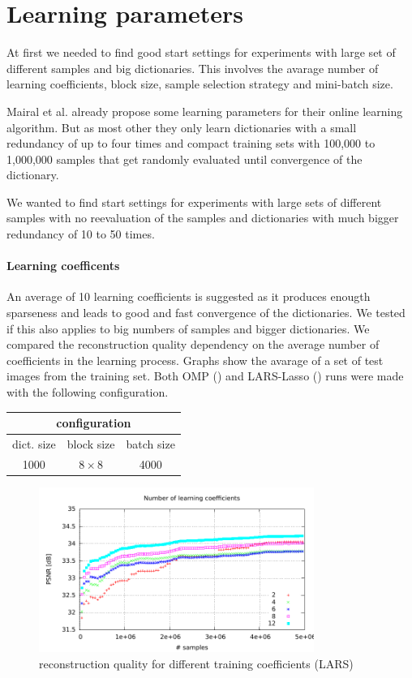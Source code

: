 \section{Learning parameters}
At first we needed to find good start settings for experiments with large set of
different samples and big dictionaries. This involves the
avarage number of learning coefficients, block size, sample selection strategy
and mini-batch size.

Mairal et al. already propose some learning parameters for their online
learning algorithm. But as most other they only learn dictionaries with
a small redundancy of up to four times and compact training sets with 100,000
to 1,000,000 samples that get randomly evaluated until convergence of the
dictionary.

We wanted to find start settings for experiments with large sets of
different samples with no reevaluation of the samples and dictionaries
with much bigger redundancy of 10 to 50 times.


\paragraph{Learning coefficents}
An average of 10 learning coefficients is suggested as it produces enougth
sparseness and leads to good and fast convergence of the dictionaries.
We tested if this also applies to big numbers of samples and bigger
dictionaries. We compared the reconstruction quality dependency on the average
number of coefficients in the learning process. Graphs show the avarage of a
set of test images from the training set. Both OMP ()
and LARS-Lasso () runs were made with the following
configuration.
\begin{table}[H]
\centering
\begin{tabular}{| c | c | c |}
\hline
\multicolumn{3}{|c|}{configuration}\\
\hline
dict. size & block size & batch size \\
\hline
1000 & $8\times 8$ & 4000  \\
\hline
\end{tabular}
\end{table}

\begin{figure}[h]
\centering
\includegraphics[width = 0.8\textwidth]{../tests/results/coeffsConverg.pdf}
\caption{reconstruction quality for different training coefficients (LARS)}
\label{fig:coeffsLasso}
\end{figure}

